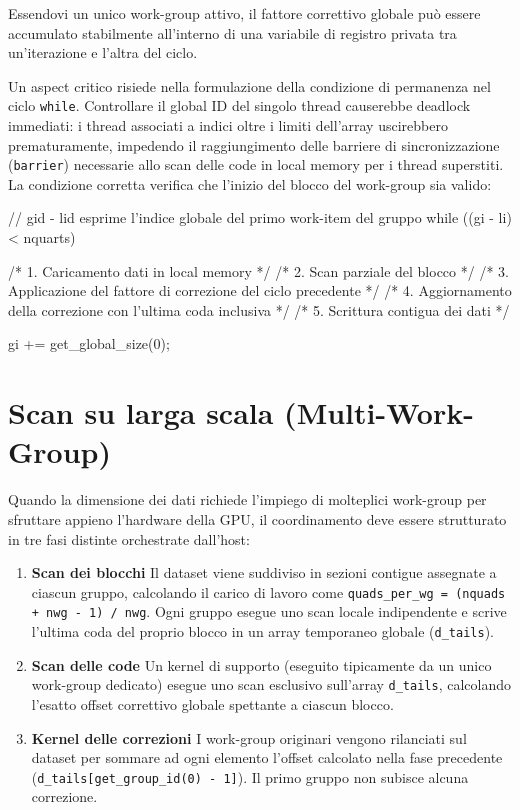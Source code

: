 Essendovi un unico work-group attivo, il fattore correttivo globale può essere accumulato stabilmente all'interno di una variabile di registro privata tra un'iterazione e l'altra del ciclo.

Un aspect critico risiede nella formulazione della condizione di permanenza nel ciclo \texttt{while}. Controllare il global ID del singolo thread causerebbe deadlock immediati: i thread associati a indici oltre i limiti dell'array uscirebbero prematuramente, impedendo il raggiungimento delle barriere di sincronizzazione (\texttt{barrier}) necessarie allo scan delle code in local memory per i thread superstiti. La condizione corretta verifica che l'inizio del blocco del work-group sia valido:

\begin{code}[caption={Struttura del ciclo while per scan a singolo work-group}, label={code:scan_while_correct}]
// gid - lid esprime l'indice globale del primo work-item del gruppo
while ((gi - li) < nquarts) {
    /* 1. Caricamento dati in local memory */
    /* 2. Scan parziale del blocco */
    /* 3. Applicazione del fattore di correzione del ciclo precedente */
    /* 4. Aggiornamento della correzione con l'ultima coda inclusiva */
    /* 5. Scrittura contigua dei dati */
    
    gi += get_global_size(0);
}
\end{code}

\section{Scan su larga scala (Multi-Work-Group)}\label{sec:scan_multi}

Quando la dimensione dei dati richiede l'impiego di molteplici work-group per sfruttare appieno l'hardware della GPU, il coordinamento deve essere strutturato in tre fasi distinte orchestrate dall'host:

\begin{enumerate}
    \item \textbf{Scan dei blocchi} Il dataset viene suddiviso in sezioni contigue assegnate a ciascun gruppo, calcolando il carico di lavoro come \texttt{quads\_per\_wg = (nquads + nwg - 1) / nwg}. Ogni gruppo esegue uno scan locale indipendente e scrive l'ultima coda del proprio blocco in un array temporaneo globale (\texttt{d\_tails}).
    \item \textbf{Scan delle code} Un kernel di supporto (eseguito tipicamente da un unico work-group dedicato) esegue uno scan esclusivo sull'array \texttt{d\_tails}, calcolando l'esatto offset correttivo globale spettante a ciascun blocco.
    \item \textbf{Kernel delle correzioni} I work-group originari vengono rilanciati sul dataset per sommare ad ogni elemento l'offset calcolato nella fase precedente (\texttt{d\_tails[get\_group\_id(0) - 1]}). Il primo gruppo non subisce alcuna correzione.
\end{enumerate}


